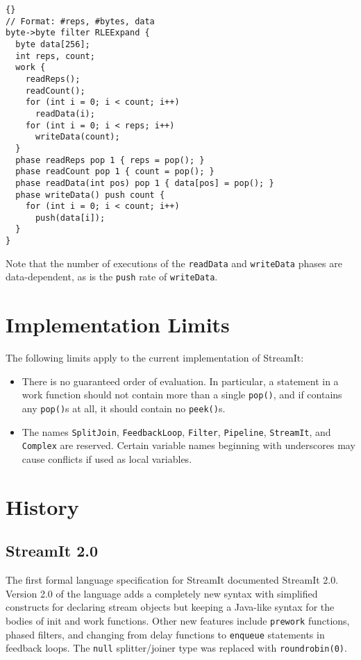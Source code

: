 \documentclass[11pt]{article}
\begin{document}
\begin{lstlisting}{}
// Format: #reps, #bytes, data
byte->byte filter RLEExpand {
  byte data[256];
  int reps, count;
  work {
    readReps();
    readCount();
    for (int i = 0; i < count; i++)
      readData(i);
    for (int i = 0; i < reps; i++)
      writeData(count);
  }
  phase readReps pop 1 { reps = pop(); }
  phase readCount pop 1 { count = pop(); }
  phase readData(int pos) pop 1 { data[pos] = pop(); }
  phase writeData() push count {
    for (int i = 0; i < count; i++)
      push(data[i]);
  }
}
\end{lstlisting}

Note that the number of executions of the \lstinline|readData| and
\lstinline|writeData| phases are data-dependent, as is the
\lstinline|push| rate of \lstinline|writeData|.

\section{Implementation Limits}

The following limits apply to the current implementation of StreamIt:

\begin{itemize}
\item There is no guaranteed order of evaluation.  In particular, a
  statement in a work function should not contain more than a single
  \lstinline|pop()|, and if contains any \lstinline|pop()|s at all, it
  should contain no \lstinline|peek()|s.
  
\item The names \lstinline|SplitJoin|, \lstinline|FeedbackLoop|,
  \lstinline|Filter|, \lstinline|Pipeline|, \lstinline|StreamIt|, and
  \lstinline|Complex| are reserved.  Certain variable names beginning
  with underscores may cause conflicts if used as local variables.

\end{itemize}

\section{History}

\subsection{StreamIt 2.0}

The first formal language specification for StreamIt documented
StreamIt 2.0.  Version 2.0 of the language adds a completely new
syntax with simplified constructs for declaring stream objects but
keeping a Java-like syntax for the bodies of init and work functions.
Other new features include \lstinline|prework| functions, phased
filters, and changing from delay functions to \lstinline|enqueue|
statements in feedback loops.  The \lstinline|null| splitter/joiner
type was replaced with \lstinline|roundrobin(0)|.
\end{document}
